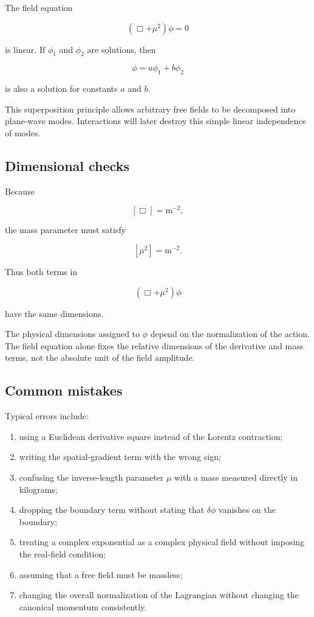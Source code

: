The field equation

\[
(\Box+\mu^{2})\phi=0
\]

is linear. If \(\phi_{1}\) and \(\phi_{2}\) are solutions, then

\[
\phi
=
a\phi_{1}+b\phi_{2}
\]

is also a solution for constants \(a\) and \(b\).

This superposition principle allows arbitrary free fields to be decomposed into plane-wave modes. Interactions will later destroy this simple linear independence of modes.

\subsection{Dimensional checks}

Because

\[
[\Box]=\mathrm{m}^{-2},
\]

the mass parameter must satisfy

\[
[\mu^{2}]=\mathrm{m}^{-2}.
\]

Thus both terms in

\[
(\Box+\mu^{2})\phi
\]

have the same dimensions.

The physical dimensions assigned to \(\phi\) depend on the normalization of the action. The field equation alone fixes the relative dimensions of the derivative and mass terms, not the absolute unit of the field amplitude.

\subsection{Common mistakes}

Typical errors include:

\begin{enumerate}
    \item using a Euclidean derivative square instead of the Lorentz contraction;
    \item writing the spatial-gradient term with the wrong sign;
    \item confusing the inverse-length parameter \(\mu\) with a mass measured directly in kilograms;
    \item dropping the boundary term without stating that \(\delta\phi\) vanishes on the boundary;
    \item treating a complex exponential as a complex physical field without imposing the real-field condition;
    \item assuming that a free field must be massless;
    \item changing the overall normalization of the Lagrangian without changing the canonical momentum consistently.
\end{enumerate}

